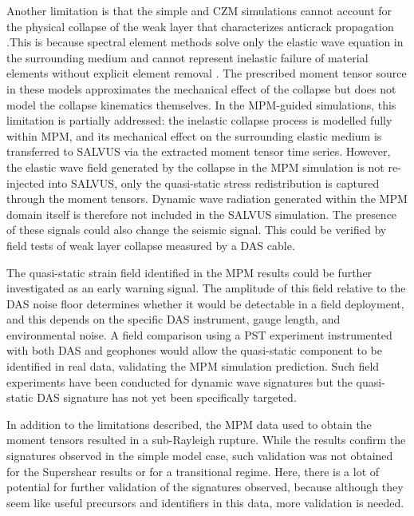Another limitation is that the simple and CZM simulations cannot account for the physical collapse
of the weak layer that characterizes anticrack propagation
\parencite{heierliAnticrackNucleationTriggering2008,
heierliAnticracksNewTheory2003}.This is because spectral element methods solve only the elastic wave equation in the surrounding medium and cannot
represent inelastic failure of material elements without explicit element
removal \parencite{podolskiyReviewFiniteelementModelling2013}. The
prescribed moment tensor source in these models approximates the
mechanical effect of the collapse but does not model the collapse
kinematics themselves. In the MPM-guided simulations, this limitation is
partially addressed: the inelastic collapse process is modelled fully
within MPM, and its mechanical effect on the surrounding elastic medium
is transferred to SALVUS via the extracted moment tensor time series.
However, the elastic wave field generated by the collapse in the MPM
simulation is not re-injected into SALVUS, only the quasi-static
stress redistribution is captured through the moment tensors. Dynamic
wave radiation generated within the MPM domain itself is therefore not
included in the SALVUS simulation. The presence of these signals could also change the seismic signal. This could be verified by field tests of weak layer collapse measured by a DAS cable. \par 

The quasi-static strain field identified in the MPM results could be further investigated as an early warning signal. The amplitude of this field relative to the DAS noise floor determines whether it would be detectable in a field deployment, and this depends on the specific DAS instrument, gauge length, and environmental noise. A field comparison using a PST experiment instrumented with both DAS and geophones would allow the quasi-static component to be identified in real data, validating the MPM simulation prediction. Such field experiments have been conducted for dynamic wave signatures
\parencite{bergfeldSignaturesSubRayleighSupershear2025,vanherwijnenSeismicSensorArray2011} but the quasi-static DAS signature has not yet been specifically targeted. \par

In addition to the limitations described, the MPM data used to obtain the moment tensors resulted in a sub-Rayleigh rupture. While the results confirm the signatures observed in the simple model case, such validation was not obtained for the Supershear results or for a transitional regime. Here, there is a lot of potential for further validation of the signatures observed, because although they seem like useful precursors and identifiers in this data, more validation is needed. \par 

